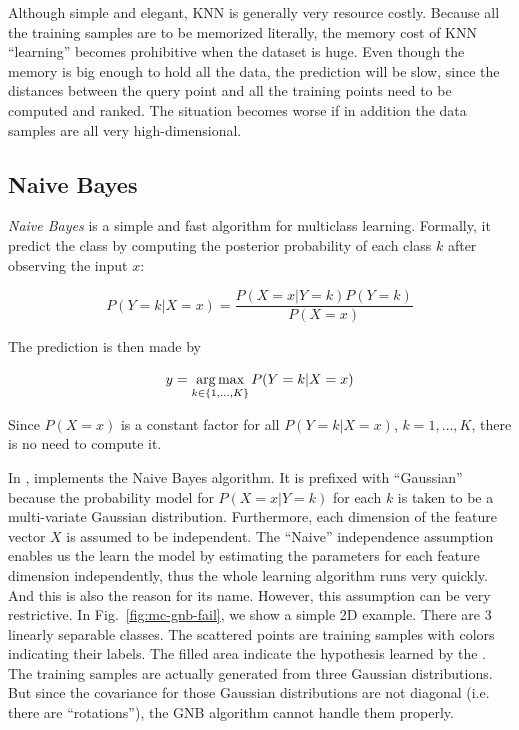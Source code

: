 Although simple and elegant, KNN is generally very resource costly. Because all
the training samples are to be memorized literally, the memory cost of KNN
``learning'' becomes prohibitive when the dataset is huge. Even though the
memory is big enough to hold all the data, the prediction will be slow, since
the distances between the query point and all the training points need to be
computed and ranked. The situation becomes worse if in addition the data
samples are all very high-dimensional.

\subsection{Naive Bayes}
\emph{Naive Bayes} is a simple and fast algorithm for multiclass learning.
Formally, it predict the class by computing the posterior probability of each
class $k$ after observing the input $x$:

\[
	P\left( Y=k | X = x \right) = \frac{P(X=x|Y=k)P(Y=k)}{P(X=x)}
\]

The prediction is then made by

\[
	y = \operatorname*{arg\,max}_{k\in\{1,\ldots,K\}} P(Y=k|X=x)
\]

Since $P(X=x)$ is a constant factor for all $P(Y=k|X=x)$, $k=1,\ldots,K$, there
is no need to compute it.

In \shogun{},  implements the Naive Bayes
algorithm. It is prefixed with ``Gaussian'' because the probability model for
$P(X=x|Y=k)$ for each $k$ is taken to be a multi-variate Gaussian distribution.
Furthermore, each dimension of the feature vector $X$ is assumed to be
independent. The ``Naive'' independence assumption enables us the learn the
model by estimating the parameters for each feature dimension independently,
thus the whole learning algorithm runs very quickly. And this is also the 
reason for its name. However, this assumption can be very restrictive. In
Fig.~\ref{fig:mc-gnb-fail}, we show a simple 2D example. There are 3 linearly
separable classes. The scattered points are training samples with colors
indicating their labels. The filled area indicate the hypothesis learned by
the . The training samples are actually
generated from three Gaussian distributions. But since the covariance for those
Gaussian distributions are not diagonal (i.e. there are ``rotations''), the GNB
algorithm cannot handle them properly.


